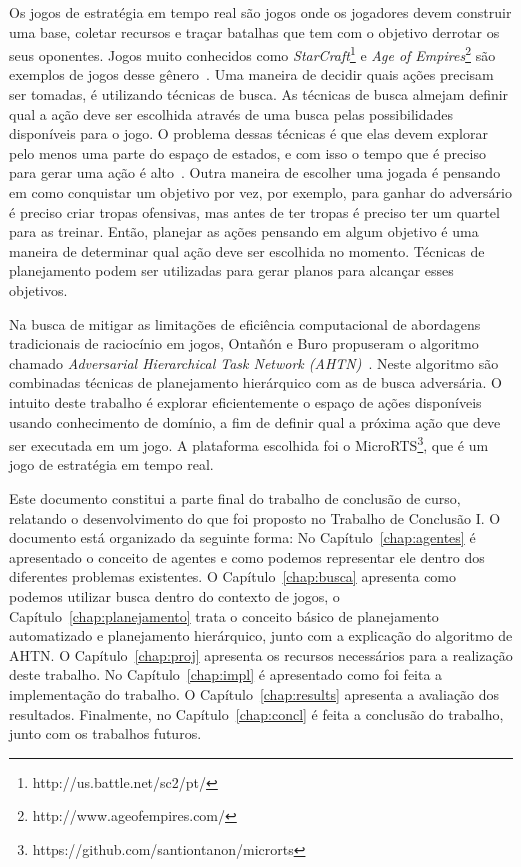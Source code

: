 Os jogos de estratégia em tempo real são jogos onde os jogadores devem construir uma base, coletar recursos e traçar batalhas que tem com o objetivo derrotar os seus oponentes.
Jogos muito conhecidos como \textit{StarCraft}\footnote{http://us.battle.net/sc2/pt/} e \textit{Age of Empires}\footnote{http://www.ageofempires.com/} são exemplos de jogos desse gênero~\cite{ontanon2013survey}.
Uma maneira de decidir quais ações precisam ser tomadas, é utilizando técnicas de busca.
As técnicas de busca almejam definir qual a ação deve ser escolhida através de uma busca pelas possibilidades disponíveis para o jogo. 
O problema dessas técnicas é que elas devem explorar pelo menos uma parte do espaço de estados, e com isso o tempo que é preciso para gerar uma ação é alto~\cite{ontanon2012minimax}.
Outra maneira de escolher uma jogada é pensando em como conquistar um objetivo por vez, por exemplo, para ganhar do adversário é preciso criar tropas ofensivas, mas antes de ter tropas é preciso ter um quartel para as treinar.
Então, planejar as ações pensando em algum objetivo é uma maneira de determinar qual ação deve ser escolhida no momento. 
Técnicas de planejamento podem ser utilizadas para gerar planos para alcançar esses objetivos. 

Na busca de mitigar as limitações de eficiência computacional de abordagens tradicionais de raciocínio em jogos, Ontañón e Buro propuseram o algoritmo chamado \textit{Adversarial Hierarchical Task Network (AHTN)}~\cite{ontanon2015adversarial}. 
Neste algoritmo são combinadas técnicas de planejamento hierárquico com as de busca adversária. 
O intuito deste trabalho é explorar eficientemente o espaço de ações disponíveis usando conhecimento de domínio, a fim de definir qual a próxima ação que deve ser executada em um jogo. 
A plataforma escolhida foi o MicroRTS\footnote{https://github.com/santiontanon/microrts}, que é um jogo de estratégia em tempo real. 

Este documento constitui a parte final do trabalho de conclusão de curso, relatando o desenvolvimento do que foi proposto no Trabalho de Conclusão I. 
O documento está organizado da seguinte forma: No Capítulo~\ref{chap:agentes} é apresentado o conceito de agentes e como podemos representar ele dentro dos diferentes problemas existentes.
O Capítulo~\ref{chap:busca} apresenta como podemos utilizar busca dentro do contexto de jogos, o Capítulo~\ref{chap:planejamento} trata o conceito básico de planejamento automatizado e planejamento hierárquico, junto com a explicação do algoritmo de AHTN. 
O Capítulo~\ref{chap:proj} apresenta os recursos necessários para a realização deste trabalho.
No Capítulo~\ref{chap:impl} é apresentado como foi feita a implementação do trabalho.
O Capítulo~\ref{chap:results} apresenta a avaliação dos resultados.
Finalmente, no Capítulo~\ref{chap:concl} é feita a conclusão do trabalho, junto com os trabalhos futuros.